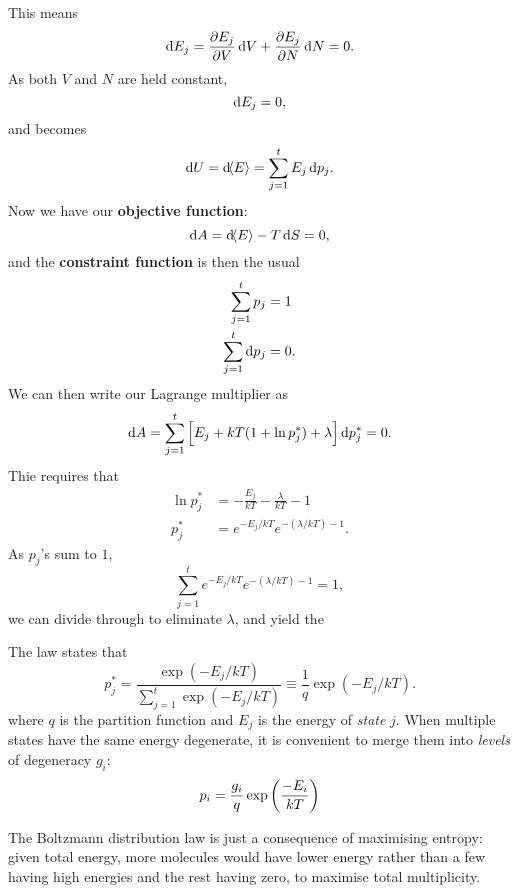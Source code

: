 This means 
\begin{equation}
\dif E_j=\diffp{E_j}{V}\dif V+\diffp{E_j}{N}\dif N=0.
\end{equation}
As both $V$ and $N$ are held constant, 
\begin{equation}
\dif E_j=0, 
\end{equation}
and  becomes
\begin{equation}
\dif U=\dif \lgl E\rgl=\sum^{t}_{j=1} E_j\dif p_j.
\end{equation}
Now we have our \textbf{objective function}:
\begin{equation}
\dif A=\dif \lgl E\rgl-T\dif S=0,
\end{equation}
and the \textbf{constraint function} is then the usual
\begin{equation}
\begin{aligned}
\sum^{t}_{j=1} p_j&=1\\
\sum^{t}_{j=1} \dif p_j&=0.
\end{aligned}
\end{equation}
We can then write our Lagrange multiplier as
\begin{equation}
\dif A=\sum^{t}_{j=1} \lf[E_j+kT(1+\ln p_j^*)+\lambda \rt]\dif p_j^*=0.
\end{equation}
Thie requires that
\begin{subequations}
\begin{align}
\ln p_j^*&=-\frac{E_j}{kT}-\frac{\lambda}{kT}-1\\
p_j^*&=e^{-E_j/kT}e^{-(\lambda/kT)-1}. \label{pstarred}
\end{align}
\end{subequations}
As $p_j$'s sum to $1$,
\begin{equation}
\label{probsum}
\sum^{t}_{j=1} e^{-E_j/kT}e^{-(\lambda/kT)-1}=1,
\end{equation}
we can divide  through  to eliminate $\lambda$, 
and yield the
\begin{thrm}
The law states that
\begin{equation}
\label{bdl}
p_j^*=\frac{\exp(-E_j/kT)}{\sum^t_{j=1}\exp(-E_j/kT)}\equiv\frac{1}{q}\exp(-E_j/kT).
\end{equation}
where $q$ is the partition function and $E_j$ is the energy of \emph{state} $j$. When multiple states have the same energy \ie degenerate, it is convenient to merge them into \emph{levels} of degeneracy $g_i$:
\begin{equation}
  p_i=\frac{g_i}{q}\exp \left(\frac{-E_i}{kT} \right)
\end{equation}
\end{thrm}
The Boltzmann distribution law is just a consequence of maximising entropy: given 
total energy, more molecules would have lower energy 
rather than a few having high energies and the rest having zero, 
to maximise total multiplicity.
